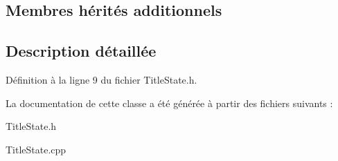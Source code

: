 \subsection*{Membres hérités additionnels}


\subsection{Description détaillée}


Définition à la ligne 9 du fichier Title\+State.\+h.



La documentation de cette classe a été générée à partir des fichiers suivants \+:\begin{DoxyCompactItemize}
\item 
Title\+State.\+h\item 
Title\+State.\+cpp\end{DoxyCompactItemize}
